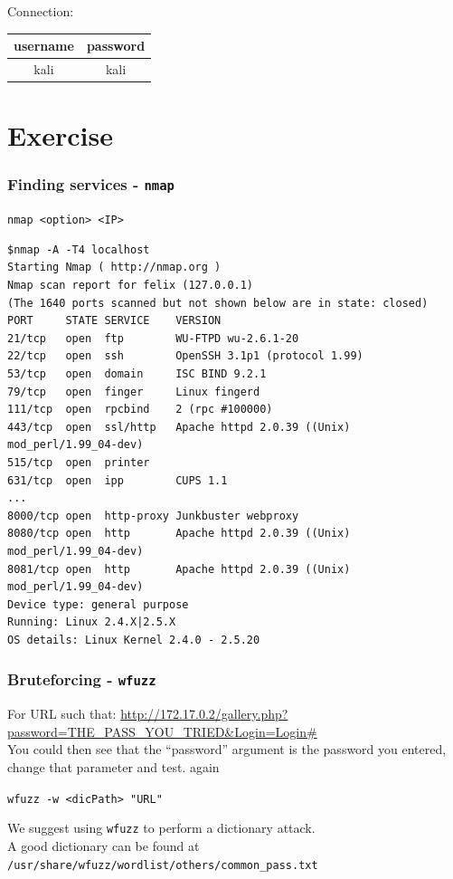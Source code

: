 \documentclass{article}
\begin{document}
\noindent Connection:
\begin{table}[h!]
\centering
\label{tab:my-table}
\begin{tabular}{c|c}
\textbf{username} & \textbf{password} \\ \hline
kali          & kali         
\end{tabular}
\end{table}

\section{Exercise}

\subsubsection{Finding services - \lstinline{nmap}}
\begin{center}
    \lstinline{nmap <option> <IP>}
\end{center}
\begin{verbatim}
$nmap -A -T4 localhost 
Starting Nmap ( http://nmap.org )
Nmap scan report for felix (127.0.0.1)
(The 1640 ports scanned but not shown below are in state: closed)
PORT     STATE SERVICE    VERSION
21/tcp   open  ftp        WU-FTPD wu-2.6.1-20
22/tcp   open  ssh        OpenSSH 3.1p1 (protocol 1.99)
53/tcp   open  domain     ISC BIND 9.2.1
79/tcp   open  finger     Linux fingerd
111/tcp  open  rpcbind    2 (rpc #100000)
443/tcp  open  ssl/http   Apache httpd 2.0.39 ((Unix) mod_perl/1.99_04-dev)
515/tcp  open  printer
631/tcp  open  ipp        CUPS 1.1
...
8000/tcp open  http-proxy Junkbuster webproxy
8080/tcp open  http       Apache httpd 2.0.39 ((Unix) mod_perl/1.99_04-dev)
8081/tcp open  http       Apache httpd 2.0.39 ((Unix) mod_perl/1.99_04-dev)
Device type: general purpose
Running: Linux 2.4.X|2.5.X
OS details: Linux Kernel 2.4.0 - 2.5.20
\end{verbatim}

\subsubsection{Bruteforcing - \lstinline{wfuzz}}
 For URL such that: \url{http://172.17.0.2/gallery.php?password=THE_PASS_YOU_TRIED&Login=Login#}\\
    You could then see that the “password” argument is the password you entered, change that parameter and test. again
\begin{center}
    \lstinline{wfuzz -w <dicPath> "URL"}
\end{center}
We suggest using \lstinline{wfuzz} to perform a dictionary attack. \\A good dictionary can be found at \lstinline{/usr/share/wfuzz/wordlist/others/common_pass.txt}\\
\end{document}
